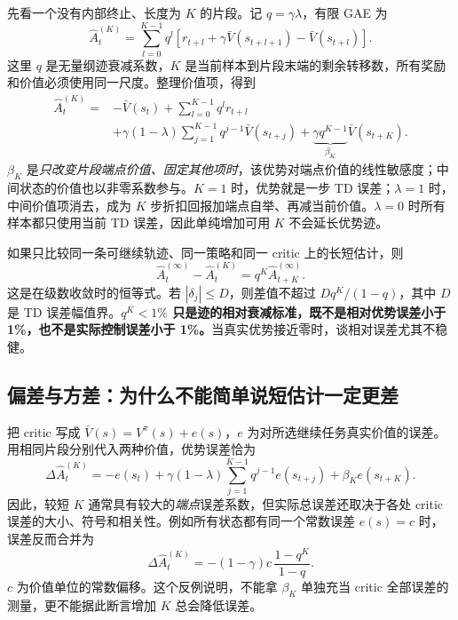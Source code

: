 \documentclass[12pt,fontset=none]{ctexart}
\numberwithin{equation}{section}
\numberwithin{table}{section}
\numberwithin{figure}{section}
\begin{document}
先看一个没有内部终止、长度为 $K$ 的片段。记 $q=\gamma\lambda$，有限 GAE 为
\begin{equation}\label{eq:gaet-finite}
 \hat A_t^{(K)}=\sum_{l=0}^{K-1}q^l
 \left[r_{t+l}+\gamma\bar V(s_{t+l+1})-\bar V(s_{t+l})\right].
\end{equation}
这里 $q$ 是无量纲迹衰减系数，$K$ 是当前样本到片段末端的剩余转移数，所有奖励和价值必须使用同一尺度。整理价值项，得到
\begin{align}\label{eq:gaet-expand}
 \hat A_t^{(K)}={}&-\bar V(s_t)
 +\sum_{l=0}^{K-1}q^l r_{t+l}\\
 &+\gamma(1-\lambda)\sum_{j=1}^{K-1}q^{j-1}\bar V(s_{t+j})
 +\underbrace{\gamma q^{K-1}}_{\beta_K}\bar V(s_{t+K}).\nonumber
\end{align}
$\beta_K$ 是\emph{只改变片段端点价值、固定其他项时}，该优势对端点价值的线性敏感度；中间状态的价值也以非零系数参与。$K=1$ 时，优势就是一步 TD 误差；$\lambda=1$ 时，中间价值项消去，成为 $K$ 步折扣回报加端点自举、再减当前价值。$\lambda=0$ 时所有样本都只使用当前 TD 误差，因此单纯增加可用 $K$ 不会延长优势迹。

如果只比较同一条可继续轨迹、同一策略和同一 critic 上的长短估计，则
\begin{equation}\label{eq:gaet-tail}
 \hat A_t^{(\infty)}-\hat A_t^{(K)}
 =q^K\hat A_{t+K}^{(\infty)}.
\end{equation}
这是在级数收敛时的恒等式。若 $|\delta_j|\leq D$，则差值不超过 $Dq^K/(1-q)$，其中 $D$ 是 TD 误差幅值界。\textbf{$q^K<1\%$ 只是迹的相对衰减标准，既不是相对优势误差小于 1\%，也不是实际控制误差小于 1\%。}当真实优势接近零时，谈相对误差尤其不稳健。

\subsection{偏差与方差：为什么不能简单说短估计一定更差}

把 critic 写成 $\bar V(s)=V^\pi(s)+e(s)$，$e$ 为对所选继续任务真实价值的误差。用相同片段分别代入两种价值，优势误差恰为
\begin{equation}\label{eq:gaet-valueerror}
 \Delta\hat A_t^{(K)}=-e(s_t)
 +\gamma(1-\lambda)\sum_{j=1}^{K-1}q^{j-1}e(s_{t+j})
 +\beta_K e(s_{t+K}).
\end{equation}
因此，较短 $K$ 通常具有较大的\emph{端点}误差系数，但实际总误差还取决于各处 critic 误差的大小、符号和相关性。例如所有状态都有同一个常数误差 $e(s)=c$ 时，误差反而合并为
\begin{equation}\label{eq:gaet-constant-error}
 \Delta\hat A_t^{(K)}
 =-(1-\gamma)c\,\frac{1-q^K}{1-q}.
\end{equation}
$c$ 为价值单位的常数偏移。这个反例说明，不能拿 $\beta_K$ 单独充当 critic 全部误差的测量，更不能据此断言增加 $K$ 总会降低误差。
\end{document}
